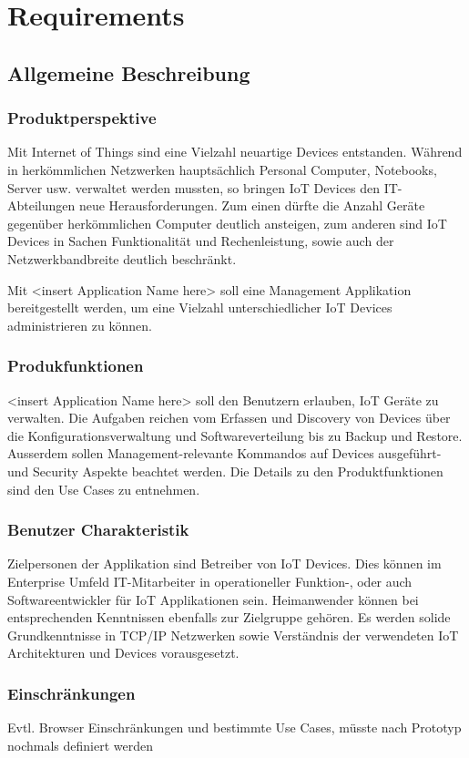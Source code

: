 \chapter{Requirements}
\section{Allgemeine Beschreibung}
\subsection{Produktperspektive}
Mit Internet of Things sind eine Vielzahl neuartige Devices entstanden. Während in herkömmlichen Netzwerken hauptsächlich Personal Computer, Notebooks, Server usw. verwaltet werden mussten, so bringen IoT Devices den IT-Abteilungen neue Herausforderungen. Zum einen dürfte die Anzahl Geräte gegenüber herkömmlichen Computer deutlich ansteigen, zum anderen sind IoT Devices in Sachen Funktionalität und Rechenleistung, sowie auch der Netzwerkbandbreite deutlich beschränkt. 

Mit <insert Application Name here> soll eine Management Applikation bereitgestellt werden, um eine Vielzahl unterschiedlicher IoT Devices administrieren zu können. 
\subsection{Produkfunktionen}
<insert Application Name here> soll den Benutzern erlauben, IoT Geräte zu verwalten. Die Aufgaben reichen vom Erfassen und Discovery von Devices über die Konfigurationsverwaltung und Softwareverteilung bis zu Backup und Restore. Ausserdem sollen Management-relevante Kommandos auf Devices ausgeführt- und Security Aspekte beachtet werden. Die Details zu den Produktfunktionen sind den Use Cases zu entnehmen.

\subsection{Benutzer Charakteristik}
Zielpersonen der Applikation sind Betreiber von IoT Devices. Dies können im Enterprise Umfeld IT-Mitarbeiter in operationeller Funktion-, oder auch Softwareentwickler für IoT Applikationen sein. Heimanwender können bei entsprechenden Kenntnissen ebenfalls zur Zielgruppe gehören. Es werden solide Grundkenntnisse in TCP/IP Netzwerken sowie Verständnis der verwendeten IoT Architekturen und Devices vorausgesetzt. 
\subsection{Einschränkungen}
Evtl. Browser Einschränkungen und bestimmte Use Cases, müsste nach Prototyp nochmals definiert werden
